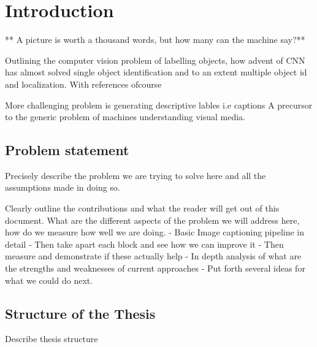 \chapter{Introduction}
\label{chapter:intro}
** A picture is worth a thousand words, but how many can the machine say?**

Outlining the computer vision problem of labelling objects, how advent of CNN
has almost solved single object identification and to an extent multiple object
id and localization. With references ofcourse

More challenging problem is generating descriptive lables i.e captions
A precursor to the generic problem of machines understanding visual media. 


\section{Problem statement}
Precisely describe the problem we are trying to solve here and all the
assumptions made in doing so.

Clearly outline the contributions and what the reader will get out of this
document. What are the different aspects of the problem we will address here,
how do we measure how well we are doing.
    - Basic Image captioning pipeline in detail
    - Then take apart each block and see how we can improve it
    - Then measure and demonstrate if these actually help
    - In depth analysis of  what are the strengths and weaknesses of current
    approaches
    - Put forth several ideas for what we could do next.


\section{Structure of the Thesis}
\label{section:structure} 
Describe thesis structure
